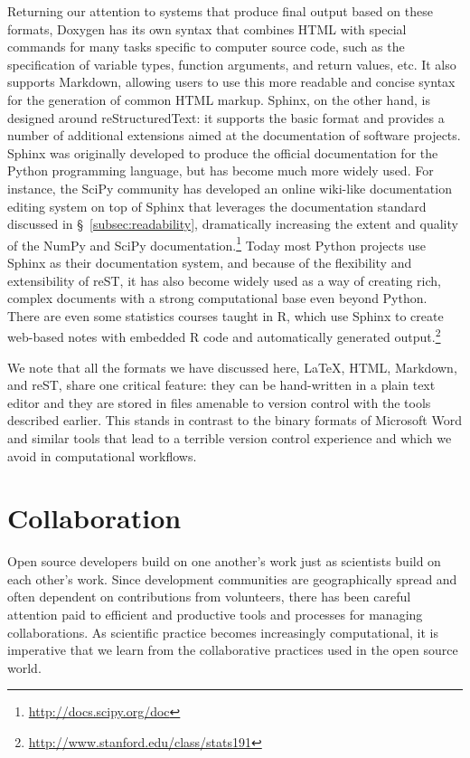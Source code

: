\documentclass[ChapterTOCs,krantz2]{krantz} %
\begin{document}
Returning our attention to systems that produce final output based on these
formats, Doxygen has its own syntax that combines HTML with special commands
for many tasks specific to computer source code, such as the specification of
variable types, function arguments, and return values, etc.  It also supports
Markdown, allowing users to use this more readable and concise syntax for the
generation of common HTML markup.  Sphinx, on the other hand, is designed
around reStructuredText: it supports the basic format and provides a number of
additional extensions aimed at the documentation of software projects. Sphinx
was originally developed to produce the official documentation for the Python
programming language, but has become much more widely used.  For instance, the
SciPy community has developed an online wiki-like documentation editing system
\cite{SciPyProceedings_27} on top of Sphinx that leverages the documentation
standard discussed in §~\ref{subsec:readability}, dramatically increasing the
extent and quality of the NumPy and SciPy
documentation.\footnote{\url{http://docs.scipy.org/doc}}  Today most Python
projects use Sphinx as their documentation system, and because of the
flexibility and extensibility of reST, it has also become widely used as a way
of creating rich, complex documents with a strong computational base even
beyond Python. There are even some statistics courses taught in R, which use
Sphinx to create web-based notes with embedded R code and automatically
generated output.\footnote{\url{http://www.stanford.edu/class/stats191}}

We note that all the formats we have discussed here, \LaTeX{}, HTML, Markdown,
and reST, share one critical feature: they can be hand-written in a plain text
editor and they are stored in files amenable to version control with the tools
described earlier.  This stands in contrast to the binary formats of
Microsoft Word and similar tools that lead to a terrible version control
experience and which we avoid in computational workflows.

\section{\label{sec:collaboration}Collaboration}

Open source developers build on one another's work just as scientists build on
each other's work.  Since development communities are geographically spread and
often dependent on contributions from volunteers, there has been careful
attention paid to efficient and productive tools and processes for managing
collaborations.  As scientific practice becomes increasingly computational, it
is imperative that we learn from the collaborative practices used in the open
source world.
\end{document}
